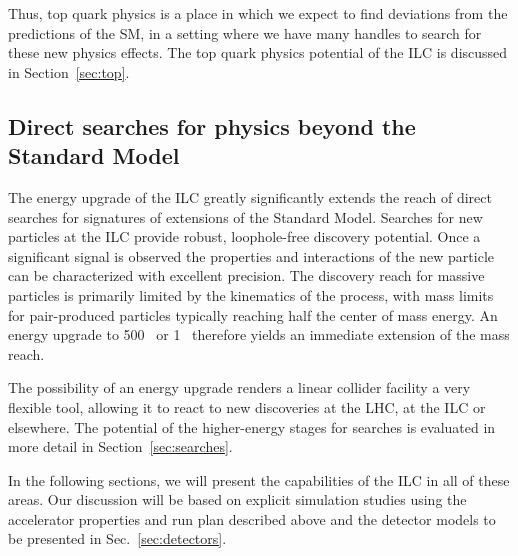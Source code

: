 Thus, top quark physics is a place in which we expect to find
deviations from the predictions of the SM, in a setting where we have
many handles to search for these new physics effects. The top quark
physics potential of the ILC is discussed in Section~\ref{sec:top}.



\subsection{Direct searches for physics beyond the Standard Model}

The energy upgrade of the ILC greatly significantly extends the reach of 
direct searches for signatures of extensions of the Standard Model. Searches
for new particles at the ILC provide robust, loophole-free
discovery potential. Once a significant signal is observed the properties and
interactions of the new particle can be characterized with excellent precision. 
The discovery reach for massive particles is 
primarily limited by the kinematics of the process, with mass limits for pair-produced particles typically reaching half the center of mass energy.
An energy upgrade to 500~\GeV{} or 1~\TeV{} therefore yields an immediate extension
of the mass reach. 

The possibility of an energy upgrade renders a linear collider facility a very 
flexible tool, allowing it to react to new discoveries at the LHC, at the ILC or
elsewhere. The potential of the higher-energy stages for searches is evaluated in 
more detail in Section~\ref{sec:searches}.

In the following sections, we will present the capabilities of the ILC
in all of these areas.  Our discussion will be based on 
explicit simulation studies using the accelerator properties
and run plan  described above and the detector models to be presented
in  Sec.~\ref{sec:detectors}.